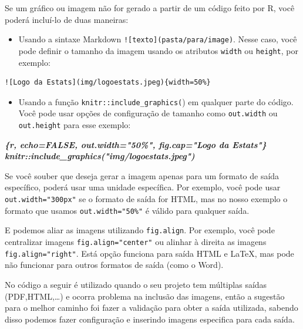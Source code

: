 \documentclass[
]{book}
\newenvironment{Shaded}{\begin{snugshade}}{\end{snugshade}}
\newcommand{\InformationTok}[1]{\textcolor[rgb]{0.56,0.35,0.01}{\textbf{\textit{#1}}}}
\providecommand{\tightlist}{%
  \setlength{\itemsep}{0pt}\setlength{\parskip}{0pt}}
\begin{document}
Se um gráfico ou imagem não for gerado a partir de um código feito por R, você poderá incluí-lo de duas maneiras:

\begin{itemize}
\tightlist
\item
  Usando a sintaxe Markdown \texttt{!{[}texto{]}(pasta/para/image)}. Nesse caso, você pode definir o tamanho da imagem usando os atributos \texttt{width} ou \texttt{height}, por exemplo:
\end{itemize}

\begin{verbatim}
![Logo da Estats](img/logoestats.jpeg){width=50%}
\end{verbatim}

\begin{itemize}
\tightlist
\item
  Usando a função \texttt{knitr::include\_graphics(}) em qualquer parte do código. Você pode usar opções de configuração de tamanho como \texttt{out.width} ou \texttt{out.height} para esse exemplo:
\end{itemize}

\begin{Shaded}
\begin{Highlighting}[]
\InformationTok{\textasciigrave{}\textasciigrave{}\textasciigrave{}\{r, echo=FALSE, out.width="50\%", fig.cap="Logo da Estats"\}}
\InformationTok{knitr::include\_graphics("img/logoestats.jpeg")}
\InformationTok{\textasciigrave{}\textasciigrave{}\textasciigrave{}}
\end{Highlighting}
\end{Shaded}

Se você souber que deseja gerar a imagem apenas para um formato de saída específico, poderá usar uma unidade específica. Por exemplo, você pode usar \texttt{out.width="300px"} se o formato de saída for HTML, mas no nosso exemplo o formato que usamos \texttt{out.width="50\%"} é válido para qualquer saída.

E podemos aliar as imagens utilizando \texttt{fig.align}. Por exemplo, você pode centralizar imagens \texttt{fig.align="center"} ou alinhar à direita as imagens \texttt{fig.align="right\textquotesingle{}"}. Está opção funciona para saída HTML e LaTeX, mas pode não funcionar para outros formatos de saída (como o Word).

No código a seguir é utilizado quando o seu projeto tem múltiplas saídas (PDF,HTML,\ldots) e ocorra problema na inclusão das imagens, então a sugestão para o melhor caminho foi fazer a validação para obter a saída utilizada, sabendo disso podemos fazer configuração e inserindo imagens especifica para cada saída.
\end{document}
